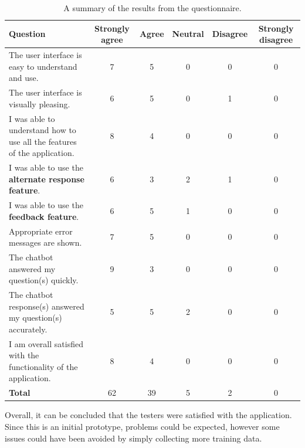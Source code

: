 \documentclass[12pt,a4paper]{article}
\newcommand{\captionstyle}[1] {
    \small{#1}
}
\begin{document}
\renewcommand\arraystretch{1.8}
\begin{table} %
	\caption{\captionstyle{A summary of the results from the questionnaire.}}\label{tbl:surveyresults}
	\begin{tabularx}{0.95\textheight}{Xccccc}
		\toprule
		Question & \tiny{\textbf{Strongly agree}} & \tiny{\textbf{Agree}} & \tiny{\textbf{Neutral}} & \small{\tiny{Disagree}} & \small{\tiny{Strongly disagree}} \\
		\midrule
		The user interface is easy to understand and use. & 7 & 5 & 0 & 0 & 0 \\
		The user interface is visually pleasing. & 6 & 5 & 0 & 1 & 0 \\
		I was able to understand how to use all the features of the application. & 8 & 4 & 0 & 0 & 0 \\
		I was able to use the \textbf{alternate response feature}. & 6 & 3 & 2 & 1 & 0\\
		I was able to use the \textbf{feedback feature}. &  6 & 5 & 1 & 0 & 0\\
		Appropriate error messages are shown. & 7 & 5 & 0 & 0 & 0 \\
		The chatbot answered my question(s) quickly. & 9 & 3 & 0 & 0 & 0 \\
		The chatbot response(s) answered my question(s) accurately. & 5 & 5 & 2 & 0 & 0 \\
		I am overall satisfied with the functionality of the application. & 8 & 4 & 0 & 0 & 0 \\
		\hline
		\textbf{Total} & 62 & 39 & 5 & 2 & 0 \\
		\bottomrule
	\end{tabularx}
\end{table}

Overall, it can be concluded that the testers were satisfied with the application. Since this is an initial prototype, problems could be expected, however some issues could have been avoided by simply collecting more training data.

%
\end{document}
